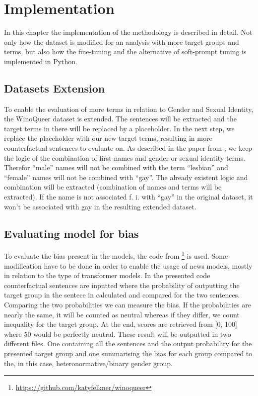 \chapter{Implementation}
In this chapter the implementation of the methodology is described in detail. Not only how the dataset is modified for an analysis with more target groups and terms, but also how the fine-tuning and the alternative of soft-prompt tuning is implemented in Python.

\section{Datasets Extension}
To enable the evaluation of more terms in relation to Gender and Sexual Identity, the WinoQueer dataset is extended. The sentences will be extracted and the target terms in there will be replaced by a placeholder. In the next step, we replace the placeholder with our new target terms, resulting in more counterfactual sentences to evaluate on. As described in the paper from \citet{winoqueer}, we keep the logic of the combination of first-names and gender or sexual identity terms. Therefor \enquote{male} names will not be combined with the term \enquote{lesbian} and \enquote{female} names will not be combined with \enquote{gay}. The already existent logic and combination will be extracted (combination of names and terms will be extracted). If the name is not associated f. i. with \enquote{gay} in the original dataset, it won't be associated with gay in the resulting extended dataset. 

\section{Evaluating model for bias}
To evaluate the bias present in the models, the code from \citet{winoqueer}\footnote{\url{https://github.com/katyfelkner/winoqueer}} is used. Some modification have to be done in order to enable the usage of news models, mostly in relation to the type of transformer models. In the presented code counterfactual sentences are inputted where the probability of outputting the target group in the sentece in calculated and compared for the two sentences. Comparing the two probabilities we can measure the bias. If the probabilities are nearly the same, it will be counted as neutral whereas if they differ, we count inequality for the target group. At the end, scores are retrieved from [0, 100] where 50 would be perfectly neutral. These result will be outputted in two different files. One containing all the sentences and the output probability for the presented target group and one summarising the bias for each group compared to the, in this case, heteronormative/binary gender group. 

